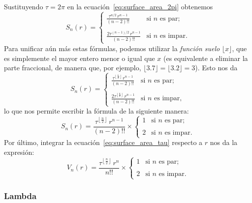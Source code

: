Sustituyendo $\tau=2\pi$ en la ecuación~\eqref{eq:surface_area_2pi} obtenemos
\[
S_n(r) = \begin{cases}
\displaystyle \frac{\tau^{n/2}\,r^{n-1}}{(n-2)!!} & \text{si } n \text{ es par}; \\ \\
\displaystyle \frac{2\tau^{(n-1)/2}\,r^{n-1}}{(n-2)!!} & \text{si } n \text{ es impar.}
\end{cases} \]
Para unificar aún más estas fórmulas, podemos utilizar la \emph{función suelo} $\lfloor x \rfloor$, que es simplemente el mayor entero menor o igual que $x$ (es equivalente a eliminar la parte fraccional, de manera que, por ejemplo, $\lfloor 3.7 \rfloor = \lfloor 3.2 \rfloor = 3$). Esto nos da
\[ S_n(r) = \begin{cases}
 \displaystyle \frac{\tau^{\left\lfloor \frac{n}{2} \right\rfloor}\,r^{n-1}}{(n-2)!!} & \text{si } n \text{ es par}; \\ \\
 \displaystyle \frac{2\tau^{\left\lfloor \frac{n}{2} \right\rfloor}\,r^{n-1}}{(n-2)!!} & \text{si } n \text{ es impar},
 \end{cases} \]
lo que nos permite escribir la fórmula de la siguiente manera:
\begin{equation}
\label{eq:surface_area_tau}
S_n(r) = \frac{\tau^{\left\lfloor \frac{n}{2} \right\rfloor}\,r^{n-1}}{(n-2)!!}\times \begin{cases}
1 & \text{si } n \text{ es par}; \\ \\
2 & \text{si } n \text{ es impar}.
\end{cases}
\end{equation}
Por último, integrar la ecuación~\eqref{eq:surface_area_tau} respecto a $r$ nos da la expresión:
\begin{equation}
\label{eq:volume_tau}
V_n(r) = \frac{\tau^{\left\lfloor \frac{n}{2} \right\rfloor}\,r^n}{n!!}\times \begin{cases}
1 & \text{si } n \text{ es par}; \\ \\
2 & \text{si } n \text{ es impar}.
\end{cases}
\end{equation}

\subsubsection{Lambda} %
\label{sec:lambda}

